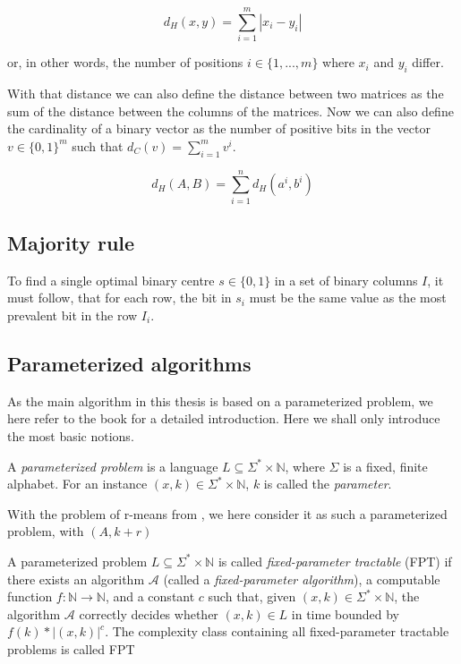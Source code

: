 \documentclass[a4paper]{article}
\begin{document}
\[
    d_H(x,y)= \sum_{i = 1}^{m} |x_i - y_i|
\]

or, in other words, the number of positions $i \in \{1,...,m\}$ where $x_i$ and $y_i$ differ.

With that distance we can
also define the distance between two matrices as the sum of the distance between the columns of
the matrices. Now we can also define the cardinality of a binary vector as the number of positive bits in
the vector $v \in \{0,1\}^m$ such that $d_C(v)=\sum_{i = 1}^{m} v^i$.

\[
    d_H(A,B) = \sum_{i = 1}^{n} d_H(a^i, b^i)
\]

\subsection{Majority rule}
To find a single optimal binary centre $s \in \{0,1\}$ in a set of binary columns $I$, it must follow, that for each row,
the bit in $s_i$ must be the same value as the most prevalent bit in the row $I_i$.

\subsection{Parameterized algorithms}
As the main algorithm in this thesis is based on a parameterized problem, we here refer to the
book \cite{param_algo_book} for a detailed introduction. Here we shall only introduce the most
basic notions.

\begin{theoremdefinition}{\cite[p.~12]{param_algo_book}}
    A \textit{parameterized problem} is a language $L \subseteq \Sigma^* \times \mathbb{N}$,
    where $\Sigma$ is a fixed, finite alphabet. For an instance $(x,k) \in \Sigma^* \times \mathbb{N}$,
    $k$ is called the \textit{parameter}.
\end{theoremdefinition}

With the problem of r-means from \cite{fomin_golovach_panolan_2020}, we here consider it as such
a parameterized problem, with $(A,k+r)$

\begin{theoremdefinition}{\cite[p.~13]{param_algo_book}}
    A parameterized problem $L \subseteq \Sigma^* \times \mathbb{N}$ is called
    \textit{fixed-parameter tractable} (FPT) if there exists an algorithm $\mathcal{A}$ (called
    a \textit{fixed-parameter algorithm}), a computable function $f:\mathbb{N} \rightarrow \mathbb{N}$,
    and a constant $c$ such that, given $(x,k) \in \Sigma^* \times \mathbb{N}$, the algorithm
    $\mathcal{A}$ correctly decides whether $(x,k) \in L$ in time bounded by $f(k) * |(x,k)|^c$.
    The complexity class containing all fixed-parameter tractable problems is called FPT
\end{theoremdefinition}
\end{document}

